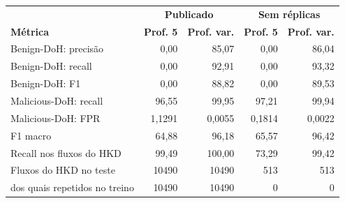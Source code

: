 \begin{tabular}{lrrrr}
\hline
\multicolumn{1}{c}{\textbf{}} & \multicolumn{2}{c}{\textbf{Publicado}} & \multicolumn{2}{c}{\textbf{Sem réplicas}} \\
\textbf{Métrica} & \textbf{Prof. 5} & \textbf{Prof. var.} & \textbf{Prof. 5} & \textbf{Prof. var.} \\ \hline
Benign-DoH: precisão & 0,00 & 85,07 & 0,00 & 86,04 \\
Benign-DoH: recall & 0,00 & 92,91 & 0,00 & 93,32 \\
Benign-DoH: F1 & 0,00 & 88,82 & 0,00 & 89,53 \\
Malicious-DoH: recall & 96,55 & 99,95 & 97,21 & 99,94 \\
Malicious-DoH: FPR & 1,1291 & 0,0055 & 0,1814 & 0,0022 \\
F1 macro & 64,88 & 96,18 & 65,57 & 96,42 \\
\hline
Recall nos fluxos do HKD & 99,49 & 100,00 & 73,29 & 99,42 \\
Fluxos do HKD no teste & 10490 & 10490 & 513 & 513 \\
dos quais repetidos no treino & 10490 & 10490 & 0 & 0 \\
\hline
\end{tabular}
